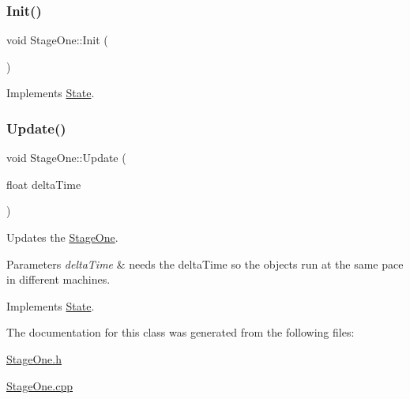 \subsubsection{\texorpdfstring{Init()}{Init()}}
{\footnotesize\ttfamily void Stage\+One\+::\+Init (\begin{DoxyParamCaption}{ }\end{DoxyParamCaption})\hspace{0.3cm}{\ttfamily [virtual]}}



Implements \mbox{\hyperlink{classState_a7ab4d8c6aa239a17ed579d89a209b156}{State}}.

\mbox{\label{classStageOne_aa26da852d0927aace63f7054fa097e2a}} 
\subsubsection{\texorpdfstring{Update()}{Update()}}
{\footnotesize\ttfamily void Stage\+One\+::\+Update (\begin{DoxyParamCaption}\item[{float}]{delta\+Time }\end{DoxyParamCaption})\hspace{0.3cm}{\ttfamily [virtual]}}



Updates the \mbox{\hyperlink{classStageOne}{Stage\+One}}. 


\begin{DoxyParams}{Parameters}
{\em delta\+Time} & needs the delta\+Time so the objects run at the same pace in different machines. \\
\hline
\end{DoxyParams}


Implements \mbox{\hyperlink{classState_a770f40188fdfc64bc95a5166fef12e02}{State}}.



The documentation for this class was generated from the following files\+:\begin{DoxyCompactItemize}
\item 
\mbox{\hyperlink{StageOne_8h}{Stage\+One.\+h}}\item 
\mbox{\hyperlink{StageOne_8cpp}{Stage\+One.\+cpp}}\end{DoxyCompactItemize}
